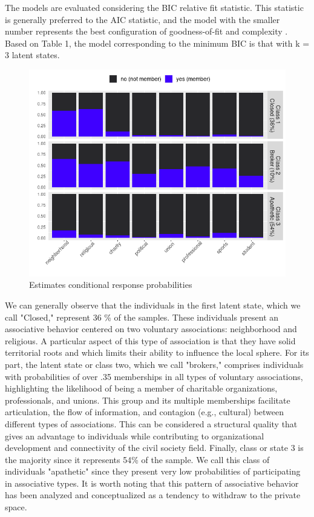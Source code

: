 The models are evaluated considering the BIC relative fit statistic. This statistic is generally preferred to the AIC statistic, and the model with the smaller number represents the best configuration of goodness-of-fit and complexity \parencite{bartolucci_latent_2015}. Based on Table 1, the model corresponding to the minimum BIC is that with k = 3 latent states. 

\begin{figure}[htp]
    \centering
    \includegraphics[width=13cm]{output/plot_latentclass2.png}
    \caption{Estimates conditional response probabilities}
    \label{fig:galaxy}
\end{figure}

We can generally observe that the individuals in the first latent state, which we call "Closed," represent 36 \% of the samples. These individuals present an associative behavior centered on two voluntary associations: neighborhood and religious. A particular aspect of this type of association is that they have solid territorial roots and which limits their ability to influence the local sphere. For its part, the latent state or class two, which we call "brokers," comprises individuals with probabilities of over .35 memberships in all types of voluntary associations, highlighting the likelihood of being a member of charitable organizations, professionals, and unions. This group and its multiple memberships facilitate articulation, the flow of information, and contagion (e.g., cultural) between different types of associations. This can be considered a structural quality that gives an advantage to individuals while contributing to organizational development and connectivity of the civil society field. Finally, class or state 3 is the majority since it represents 54\% of the sample. We call this class of individuals "apathetic" since they present very low probabilities of participating in associative types. It is worth noting that this pattern of associative behavior has been analyzed and conceptualized as a tendency to withdraw to the private space.




